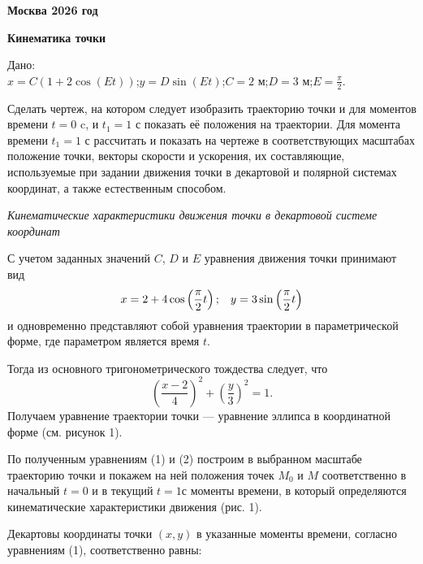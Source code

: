 \documentclass{article}
\begin{document}
\vfill
\textbf{Москва 2026 год}
\vspace{1cm}

\endgroup



\newpage

\begin{center}\large \textbf{Кинематика точки} \end{center}

\noindent Дано:\\
$x = C(1 + 2 \cos(Et))$;\quad $y = D \sin(Et)$;\quad $C = 2$ м;\quad $D = 3$ м;\quad $E = \frac{\pi}{2}$.

Сделать чертеж, на котором следует изобразить траекторию точки
и для моментов времени $t=0$ c, и $t_1=1$ с показать её положения на траектории.
Для момента времени $t_1=1$ с рассчитать и показать на чертеже в соответствующих 
масштабах положение точки, векторы скорости и ускорения, их составляющие, используемые при 
задании движения точки в декартовой и полярной системах координат, а также
естественным способом.


\newpage



\textit{\textsf{Кинематические характеристики движения точки в декартовой
системе координат}}

\bigskip

С учетом заданных значений $C$, $D$ и $E$ уравнения движения точки принимают вид
\begin{equation}x = 2 + 4 \cos\left(\frac{\pi}{2}t\right) \text{;\quad} y = 3 \sin\left(\frac{\pi}{2}t\right)\end{equation}
и одновременно представляют собой уравнения траектории в параметрической форме,
где параметром является время $t$.


Тогда из основного тригонометрического тождества следует, что
\begin{equation}\left(\frac{x-2}{4}\right)^2 + \left(\frac{y}{3}\right)^2 = 1.\end{equation}
Получаем уравнение траектории точки — уравнение эллипса в координатной форме (см. рисунок 1).

По полученным уравнениям (1) и (2) построим в выбранном масштабе траекторию
точки и покажем на ней положения точек $M_0\text{ и }M$ соответственно в начальный 
$t=0\text{ и в текущий }t=1\text{с}$ моменты времени, в который определяются
кинематические характеристики движения (рис. 1).

Декартовы координаты точки $(x,y)$ в указанные моменты времени, согласно уравнениям
(1), соответственно равны:
\end{document}
